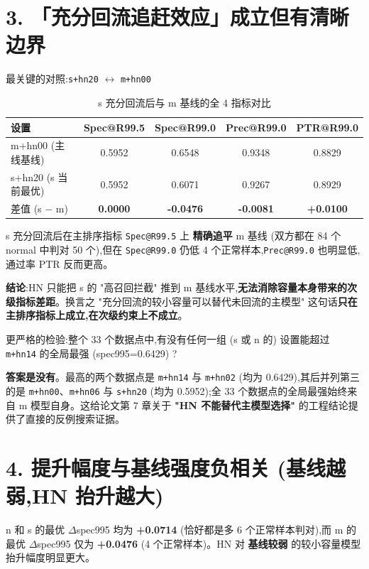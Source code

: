 \documentclass[UTF8,12pt,a4paper]{ctexart}
\begin{document}
\bigskip
\section*{3. 「充分回流追赶效应」成立但有清晰边界}

最关键的对照:\texttt{s+hn20} \(\leftrightarrow\) \texttt{m+hn00}

\begin{table}[h]
\centering
\caption{s 充分回流后与 m 基线的全 4 指标对比}
\begin{tabular}{lcccc}
\toprule
设置 & Spec@R99.5 & Spec@R99.0 & Prec@R99.0 & PTR@R99.0 \\
\midrule
m+hn00 (主线基线) & 0.5952 & 0.6548 & 0.9348 & 0.8829 \\
s+hn20 (s 当前最优) & 0.5952 & 0.6071 & 0.9267 & 0.8929 \\
\midrule
差值 (s \(-\) m) & \textbf{0.0000} & \textbf{-0.0476} & \textbf{-0.0081} & \textbf{+0.0100} \\
\bottomrule
\end{tabular}
\end{table}

s 充分回流后在主排序指标 \texttt{Spec@R99.5} 上 \textbf{精确追平} m 基线 (双方都在 84 个 normal 中判对 50 个),但在 \texttt{Spec@R99.0} 仍低 4 个正常样本,\texttt{Prec@R99.0} 也明显低,通过率 PTR 反而更高。

\textbf{结论}:HN 只能把 s 的 "高召回拦截" 推到 m 基线水平,\textbf{无法消除容量本身带来的次级指标差距}。换言之 "充分回流的较小容量可以替代未回流的主模型" 这句话\textbf{只在主排序指标上成立,在次级约束上不成立}。

\bigskip
\noindent 更严格的检验:整个 33 个数据点中,有没有任何一组 (s 或 n 的) 设置能超过 \texttt{m+hn14} 的全局最强 (spec995=0.6429) ?

\textbf{答案是没有}。最高的两个数据点是 \texttt{m+hn14} 与 \texttt{m+hn02} (均为 0.6429),其后并列第三的是 \texttt{m+hn00}、\texttt{m+hn06} 与 \texttt{s+hn20} (均为 0.5952);全 33 个数据点的全局最强始终来自 m 模型自身。这给论文第 7 章关于 \textbf{"HN 不能替代主模型选择"} 的工程结论提供了直接的反例搜索证据。

\bigskip
\section*{4. 提升幅度与基线强度负相关 \mdseries (基线越弱,HN 抬升越大)}

n 和 s 的最优 \(\Delta\)spec995 均为 \textbf{+0.0714} (恰好都是多 6 个正常样本判对),而 m 的最优 \(\Delta\)spec995 仅为 \textbf{+0.0476} (4 个正常样本)。HN 对 \textbf{基线较弱} 的较小容量模型抬升幅度明显更大。
\end{document}
